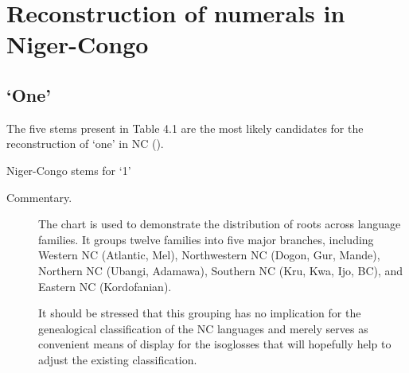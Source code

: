 \chapter{Reconstruction of numerals in Niger-Congo}\label{sec:4}
 
\section{‘One’} 
The five stems present in Table 4.1 are the most likely candidates for the reconstruction of ‘one’ in NC ().




\begin{table}
\caption{\label{tab:4:1}Niger-Congo stems for `1'}
\kppyramid












 
\end{table}
\begin{description}
\item[Commentary.] The chart is used to demonstrate the distribution of roots across language families. It groups twelve families into five major branches, including 
Western NC (Atlantic, Mel),
Northwestern NC (Dogon, Gur, Mande), 
Northern NC (Ubangi, Adamawa),
Southern NC (Kru, Kwa, Ijo, BC), and 
Eastern NC (Kordofanian). 

It should be stressed that this grouping has no implication for the genealogical classification of the NC languages and merely serves as convenient means of display for the isoglosses that will hopefully help to adjust the existing classification.
\end{description}

